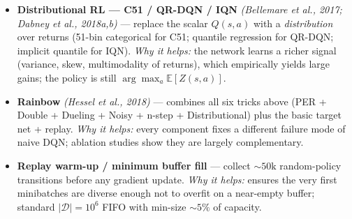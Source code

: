 \documentclass[11pt]{article}
\begin{document}
\begin{itemize}
  faster reward propagation, same trade-off as \(n\)-step TD; typical
  \(n=3\) on Atari. \emph{Interaction:} technically makes the target
  \emph{slightly} off-policy when combined with \(\varepsilon\)-greedy,
  but in practice the small bias is dominated by faster convergence.
\item
  \label{trick-3-3-6}\textbf{Distributional RL --- C51 /
  QR-DQN / IQN} \emph{(Bellemare et al., 2017; Dabney et al., 2018a,b)}
  --- replace the scalar \(Q(s,a)\) with a \emph{distribution} over
  returns (51-bin categorical for C51; quantile regression for QR-DQN;
  implicit quantile for IQN). \emph{Why it helps:} the network learns a
  richer signal (variance, skew, multimodality of returns), which
  empirically yields large gains; the policy is still
  \(\arg\max_a \mathbb{E}[Z(s,a)]\).
\item
  \label{trick-3-3-7}\textbf{Rainbow} \emph{(Hessel et
  al., 2018)} --- combines all six tricks above (PER + Double + Dueling
  + Noisy + n-step + Distributional) plus the basic target net + replay.
  \emph{Why it helps:} every component fixes a different failure mode of
  naive DQN; ablation studies show they are largely complementary.
\item
  \label{trick-3-3-8}\textbf{Replay warm-up / minimum
  buffer fill} --- collect \(\sim\!50\text{k}\) random-policy
  transitions before any gradient update. \emph{Why it helps:} ensures
  the very first minibatches are diverse enough not to overfit on a
  near-empty buffer; standard \(|\mathcal{D}|=10^6\) FIFO with min-size
  \(\sim\!5\%\) of capacity.
\end{itemize}

    \label{pseudo-3-3}
\end{document}
